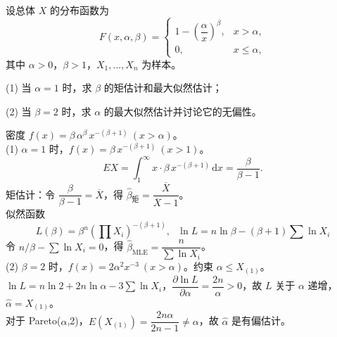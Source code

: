 ﻿\documentclass[lang=cn,11pt]{elegantbook}
\begin{document}
\begin{exercise}\label{exer:7-pareto}
设总体 \(X\) 的分布函数为
\[
F(x,\alpha,\beta) = \begin{cases} 1-\left(\dfrac{\alpha}{x}\right)^{\!\beta}, & x > \alpha, \\ 0, & x \leq \alpha, \end{cases}
\]
其中 \(\alpha > 0\)，\(\beta > 1\)，\(X_1, \dots, X_n\) 为样本。\par
(1) 当 \(\alpha=1\) 时，求 \(\beta\) 的矩估计和最大似然估计；\par
(2) 当 \(\beta=2\) 时，求 \(\alpha\) 的最大似然估计并讨论它的无偏性。
\end{exercise}
\begin{solution}
密度 \(f(x) = \beta\,\alpha^\beta\,x^{-(\beta+1)}\ (x > \alpha)\)。\\
(1) \(\alpha=1\) 时，\(f(x) = \beta\,x^{-(\beta+1)}\ (x > 1)\)。
\[
EX = \int_1^\infty x\cdot\beta\,x^{-(\beta+1)}\,\mathrm{d}x = \frac{\beta}{\beta-1}.
\]
矩估计：令 \(\dfrac{\beta}{\beta-1} = \overline{X}\)，得 \(\hat{\beta}_{\text{矩}} = \dfrac{\overline{X}}{\overline{X}-1}\)。\\
似然函数 \[L(\beta) = \beta^n\!\left(\prod X_i\right)^{-(\beta+1)},~~~\ln L = n\ln\beta - (\beta+1)\sum\ln X_i\]
令 \(n/\beta - \sum\ln X_i = 0\)，得 \(\hat{\beta}_{\text{MLE}} = \dfrac{n}{\sum\ln X_i}\)。\\
(2) \(\beta=2\) 时，\(f(x) = 2\alpha^2 x^{-3}\ (x > \alpha)\)。约束 \(\alpha \leq X_{(1)}\)。\\
\(\ln L = n\ln 2 + 2n\ln\alpha - 3\sum\ln X_i\)，\(\dfrac{\partial\ln L}{\partial\alpha} = \dfrac{2n}{\alpha} > 0\)，故 \(L\) 关于 \(\alpha\) 递增，\(\hat{\alpha} = X_{(1)}\)。\\
对于 Pareto(\(\alpha\),2)，\(E(X_{(1)}) = \dfrac{2n\alpha}{2n-1} \neq \alpha\)，故 \(\hat{\alpha}\) 是有偏估计。
\end{solution}
\end{document}
